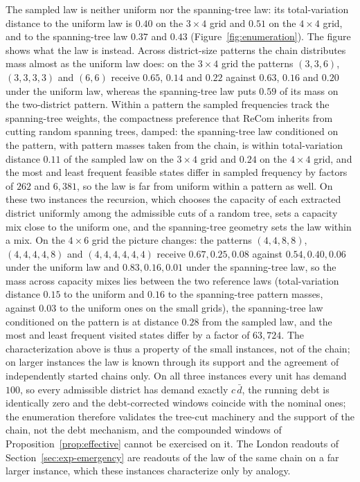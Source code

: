 \documentclass[preprint,12pt,authoryear]{elsarticle}
\theoremstyle{definition}
\begin{document}
The sampled law is neither uniform nor the spanning-tree law: its total-variation distance to the uniform law is $0.40$ on the $3\times4$ grid and $0.51$ on the $4\times4$ grid, and to the spanning-tree law $0.37$ and $0.43$ (Figure~\ref{fig:enumeration}). The figure shows what the law is instead. Across district-size patterns the chain distributes mass almost as the uniform law does: on the $3\times4$ grid the patterns $(3,3,6)$, $(3,3,3,3)$ and $(6,6)$ receive $0.65$, $0.14$ and $0.22$ against $0.63$, $0.16$ and $0.20$ under the uniform law, whereas the spanning-tree law puts $0.59$ of its mass on the two-district pattern. Within a pattern the sampled frequencies track the spanning-tree weights, the compactness preference that ReCom inherits from cutting random spanning trees, damped: the spanning-tree law conditioned on the pattern, with pattern masses taken from the chain, is within total-variation distance $0.11$ of the sampled law on the $3\times4$ grid and $0.24$ on the $4\times4$ grid, and the most and least frequent feasible states differ in sampled frequency by factors of $262$ and $6{,}381$, so the law is far from uniform within a pattern as well. On these two instances the recursion, which chooses the capacity of each extracted district uniformly among the admissible cuts of a random tree, sets a capacity mix close to the uniform one, and the spanning-tree geometry sets the law within a mix. On the $4\times6$ grid the picture changes: the patterns $(4,4,8,8)$, $(4,4,4,4,8)$ and $(4,4,4,4,4,4)$ receive $0.67, 0.25, 0.08$ against $0.54, 0.40, 0.06$ under the uniform law and $0.83, 0.16, 0.01$ under the spanning-tree law, so the mass across capacity mixes lies between the two reference laws (total-variation distance $0.15$ to the uniform and $0.16$ to the spanning-tree pattern masses, against $0.03$ to the uniform ones on the small grids), the spanning-tree law conditioned on the pattern is at distance $0.28$ from the sampled law, and the most and least frequent visited states differ by a factor of $63{,}724$. The characterization above is thus a property of the small instances, not of the chain; on larger instances the law is known through its support and the agreement of independently started chains only. On all three instances every unit has demand $100$, so every admissible district has demand exactly $c\,\bar d$, the running debt is identically zero and the debt-corrected windows coincide with the nominal ones; the enumeration therefore validates the tree-cut machinery and the support of the chain, not the debt mechanism, and the compounded windows of Proposition~\ref{prop:effective} cannot be exercised on it. The London readouts of Section~\ref{sec:exp-emergency} are readouts of the law of the same chain on a far larger instance, which these instances characterize only by analogy.
\end{document}
